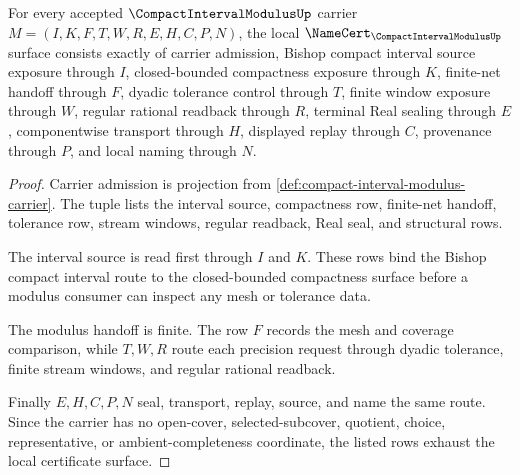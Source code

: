 \begin{theorem}
\label{thm:compact-interval-modulus-namecert-obligations}
For every accepted $\CompactIntervalModulusUp$ carrier $M=(I,K,F,T,W,R,E,H,C,P,N)$, the local $\NameCert_{\CompactIntervalModulusUp}$ surface consists exactly of carrier admission, Bishop compact interval source exposure through $I$, closed-bounded compactness exposure through $K$, finite-net handoff through $F$, dyadic tolerance control through $T$, finite window exposure through $W$, regular rational readback through $R$, terminal Real sealing through $E$, componentwise transport through $H$, displayed replay through $C$, provenance through $P$, and local naming through $N$.
\end{theorem}
\begin{proof}
Carrier admission is projection from \autoref{def:compact-interval-modulus-carrier}. The tuple lists the interval source, compactness row, finite-net handoff, tolerance row, stream windows, regular readback, Real seal, and structural rows.

The interval source is read first through $I$ and $K$. These rows bind the Bishop compact interval route to the closed-bounded compactness surface before a modulus consumer can inspect any mesh or tolerance data.

The modulus handoff is finite. The row $F$ records the mesh and coverage comparison, while $T,W,R$ route each precision request through dyadic tolerance, finite stream windows, and regular rational readback.

Finally $E,H,C,P,N$ seal, transport, replay, source, and name the same route. Since the carrier has no open-cover, selected-subcover, quotient, choice, representative, or ambient-completeness coordinate, the listed rows exhaust the local certificate surface.
\end{proof}

